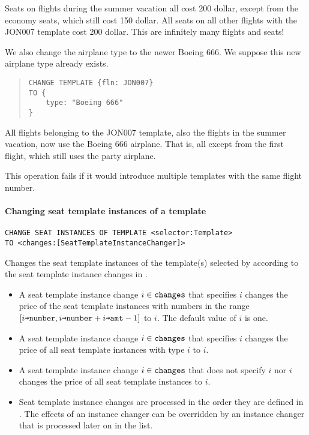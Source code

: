 \begin{texa}
  Seats on flights during the summer vacation all cost 200 dollar, except from
  the economy seats, which still cost 150 dollar. All seats on all other flights
  with the JON007 template cost 200 dollar. This are infinitely many flights and
  seats!

  We also change the airplane type to the newer Boeing 666. We suppose this new
  airplane type already exists.
  \begin{quote}\begin{lstlisting}
CHANGE TEMPLATE {fln: JON007}
TO {
    type: "Boeing 666"
}
  \end{lstlisting}\end{quote}
  All flights belonging to the JON007 template, also the flights in the summer
  vacation, now use the Boeing 666 airplane. That is, all except from the first
  flight, which still uses the party airplane.
\end{texa}
\vspace{\baselineskip}
This operation fails if it would introduce multiple templates with the same
flight number.

\paragraph{Changing seat template instances of a template}
\begin{operation}
  \label{op:change_seat_template_instance}
  \begin{lstlisting}
CHANGE SEAT INSTANCES OF TEMPLATE <selector:Template>
TO <changes:[SeatTemplateInstanceChanger]>
  \end{lstlisting}
\end{operation}
Changes the seat template instances of the template(s) selected by
 according to the seat template instance changes in .
\begin{itemize}
  \item A seat template instance change $i\in\texttt{changes}$ that specifies
    $i$ changes the price of the seat template instances with
    numbers in the range $[i\texttt{→number},i\texttt{→number}+i\texttt{→amt}-1]$ to
    $i$. The default value of $i$ is one.

  \item A seat template instance change $i\in\texttt{changes}$ that specifies
    $i$ changes the price of all seat template instances with type
    $i$ to $i$.

  \item A seat template instance change $i\in\texttt{changes}$ that does not specify
    $i$ nor $i$ changes the price of all seat template
    instances to $i$.

  \item Seat template instance changes are processed in the order they are
    defined in . The effects of an instance changer can be overridden
    by an instance changer that is processed later on in the list.
\end{itemize}

